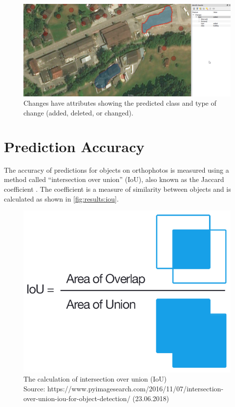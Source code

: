 \begin{figure}[H]
    \centering
	\includegraphics[width=1\linewidth]{chapters/practical_results/images/qgis_changes_attributes.png}
	\caption{Changes have attributes showing the predicted class and type of change (added, deleted, or changed).}
	\label{fig:plugin:change_attributes}
\end{figure}

\section{Prediction Accuracy}
The accuracy of predictions for objects on orthophotos is measured using a method called “intersection over union” (IoU), also known as the Jaccard coefficient \cite{Liu.2011}. The coefficient is a measure of similarity between objects and is calculated as shown in \autoref{fig:results:iou}.

\begin{figure}[H]
    \centering
	\includegraphics[width=0.6\linewidth]{chapters/practical_results/images/iou_equation.png}
	\caption{The calculation of intersection over union (IoU)\\Source: https://www.pyimagesearch.com/2016/11/07/intersection-over-union-iou-for-object-detection/ (23.06.2018)}
	\label{fig:results:iou}
\end{figure}

